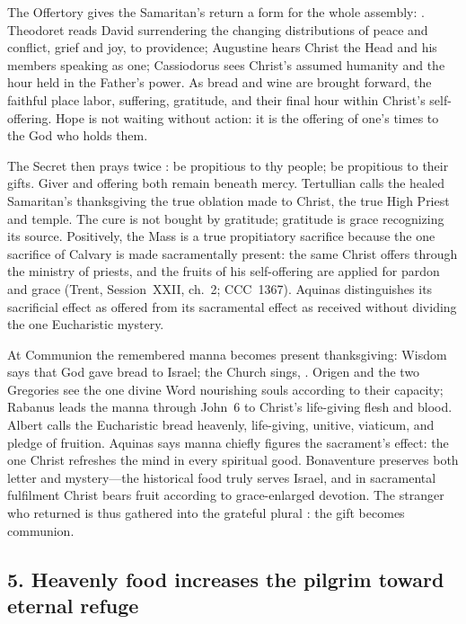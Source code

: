 The Offertory gives the Samaritan's return a form for the whole assembly:
. Theodoret reads David surrendering the changing distributions of peace
and conflict, grief and joy, to providence; Augustine hears Christ the Head and
his members speaking as one; Cassiodorus sees Christ's assumed humanity and
the hour held in the Father's power. As bread and wine are brought forward,
the faithful place labor, suffering, gratitude, and their final hour within
Christ's self-offering. Hope is not waiting without action: it is the offering
of one's times to the God who holds them.

The Secret then prays twice : be propitious to thy people;
be propitious to their gifts. Giver and offering both remain beneath mercy.
Tertullian calls the healed Samaritan's thanksgiving the true oblation made to
Christ, the true High Priest and temple. The cure is not bought by gratitude;
gratitude is grace recognizing its source. Positively, the Mass is a true
propitiatory sacrifice because the one sacrifice of Calvary is made
sacramentally present: the same Christ offers through the ministry of priests,
and the fruits of his self-offering are applied for pardon and grace (Trent,
Session~XXII, ch.~2; CCC~1367). Aquinas distinguishes its sacrificial effect as
offered from its sacramental effect as received without dividing the one
Eucharistic mystery.

At Communion the remembered manna becomes present thanksgiving: Wisdom says
that God gave bread to Israel; the Church sings, . Origen and the two Gregories see the one divine Word nourishing
souls according to their capacity; Rabanus leads the manna through John~6 to
Christ's life-giving flesh and blood. Albert calls the Eucharistic bread
heavenly, life-giving, unitive, viaticum, and pledge of fruition. Aquinas says
manna chiefly figures the sacrament's effect: the one Christ refreshes the mind
in every spiritual good. Bonaventure preserves both letter and mystery---the
historical food truly serves Israel, and in sacramental fulfilment Christ bears
fruit according to grace-enlarged devotion. The stranger who returned is thus
gathered into the grateful plural : the gift becomes communion.

\subsection*{5. Heavenly food increases the pilgrim toward eternal refuge\enspace{}}

